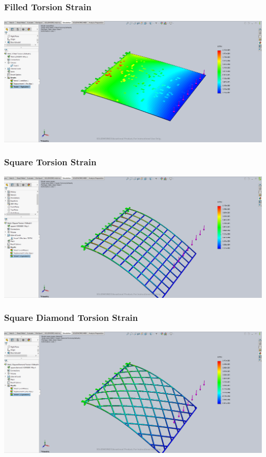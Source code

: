 \documentclass[12pt, letterpaper]{article}
\begin{document}
\begin{singlespace}
\subsubsection{Filled Torsion Strain}
\label{ap:f-to-es}
\includegraphics[width=0.8\linewidth]{./graphs/torsion/filled-torsion-strain}

\subsubsection{Square Torsion Strain}
\label{ap:s-to-es}
\includegraphics[width=0.8\linewidth]{./graphs/torsion/square-torsion-strain}

\subsubsection{Square Diamond Torsion Strain}
\label{ap:sd-to-es}
\includegraphics[width=0.8\linewidth]{./graphs/torsion/square-diamond-torsion-strain}


\end{singlespace}
\end{document}
